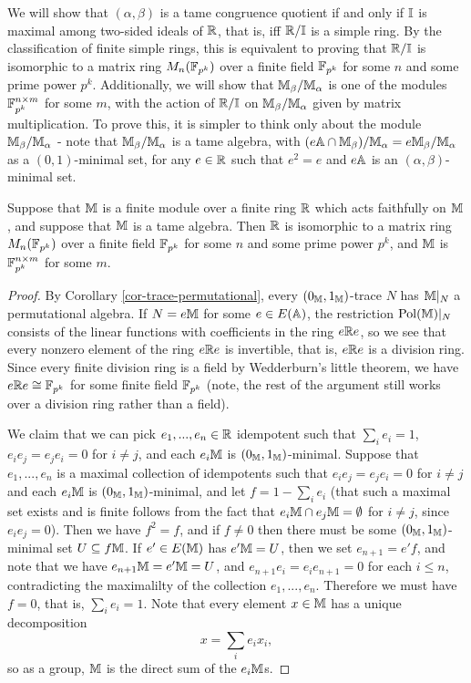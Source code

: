 \begin{appendices}
\begin{ex}
We will show that $(\alpha,\beta)$ is a tame congruence quotient if and only if $\mathbb{I}$ is maximal among two-sided ideals of $\mathbb{R}$, that is, iff $\mathbb{R}/\mathbb{I}$ is a simple ring. By the classification of finite simple rings, this is equivalent to proving that $\mathbb{R}/\mathbb{I}$ is isomorphic to a matrix ring $M_n(\mathbb{F}_{p^k})$ over a finite field $\mathbb{F}_{p^k}$ for some $n$ and some prime power $p^k$. Additionally, we will show that $\mathbb{M}_\beta/\mathbb{M}_\alpha$ is one of the modules $\mathbb{F}_{p^k}^{n\times m}$ for some $m$, with the action of $\mathbb{R}/\mathbb{I}$ on $\mathbb{M}_\beta/\mathbb{M}_\alpha$ given by matrix multiplication. To prove this, it is simpler to think only about the module $\mathbb{M}_\beta/\mathbb{M}_\alpha$ - note that $\mathbb{M}_\beta/\mathbb{M}_\alpha$ is a tame algebra, with $(e\mathbb{A}\cap \mathbb{M}_\beta)/\mathbb{M}_\alpha = e\mathbb{M}_\beta/\mathbb{M}_\alpha$ as a $(0,1)$-minimal set, for any $e \in \mathbb{R}$ such that $e^2 = e$ and $e\mathbb{A}$ is an $(\alpha,\beta)$-minimal set.
\end{ex}

\begin{prop} Suppose that $\mathbb{M}$ is a finite module over a finite ring $\mathbb{R}$ which acts faithfully on $\mathbb{M}$, and suppose that $\mathbb{M}$ is a tame algebra. Then $\mathbb{R}$ is isomorphic to a matrix ring $M_n(\mathbb{F}_{p^k})$ over a finite field $\mathbb{F}_{p^k}$ for some $n$ and some prime power $p^k$, and $\mathbb{M}$ is $\mathbb{F}_{p^k}^{n\times m}$ for some $m$.
\end{prop}
\begin{proof}
By Corollary \ref{cor-trace-permutational}, every $(0_{\mathbb{M}},1_{\mathbb{M}})$-trace $N$ has $\mathbb{M}|_N$ a permutational algebra. If $N = e\mathbb{M}$ for some $e \in E(\mathbb{A})$, the restriction $\operatorname{Pol}(\mathbb{M})|_N$ consists of the linear functions with coefficients in the ring $e\mathbb{R} e$, so we see that every nonzero element of the ring $e\mathbb{R} e$ is invertible, that is, $e\mathbb{R} e$ is a division ring. Since every finite division ring is a field by Wedderburn's little theorem, we have $e \mathbb{R} e \cong \mathbb{F}_{p^k}$ for some finite field $\mathbb{F}_{p^k}$ (note, the rest of the argument still works over a division ring rather than a field).

We claim that we can pick $e_1, ..., e_n \in \mathbb{R}$ idempotent such that $\sum_i e_i = 1$, $e_ie_j = e_je_i = 0$ for $i \ne j$, and each $e_i\mathbb{M}$ is $(0_{\mathbb{M}},1_{\mathbb{M}})$-minimal. Suppose that $e_1, ..., e_n$ is a maximal collection of idempotents such that $e_ie_j = e_je_i = 0$ for $i \ne j$ and each $e_i\mathbb{M}$ is $(0_{\mathbb{M}},1_{\mathbb{M}})$-minimal, and let $f = 1 - \sum_i e_i$ (that such a maximal set exists and is finite follows from the fact that $e_i\mathbb{M} \cap e_j\mathbb{M} = \emptyset$ for $i \ne j$, since $e_ie_j = 0$). Then we have $f^2 = f$, and if $f \ne 0$ then there must be some $(0_{\mathbb{M}},1_{\mathbb{M}})$-minimal set $U \subseteq f\mathbb{M}$. If $e' \in E(\mathbb{M})$ has $e'\mathbb{M} = U$, then we set $e_{n+1} = e'f$, and note that we have $e_{n+1}\mathbb{M} = e'\mathbb{M} = U$, and $e_{n+1}e_i = e_ie_{n+1} = 0$ for each $i \le n$, contradicting the maximalilty of the collection $e_1, ..., e_n$. Therefore we must have $f = 0$, that is, $\sum_i e_i = 1$. Note that every element $x \in \mathbb{M}$ has a unique decomposition
\[
x = \sum_i e_ix_i,
\]
so as a group, $\mathbb{M}$ is the direct sum of the $e_i\mathbb{M}$s.


\end{proof}
\end{appendices}
